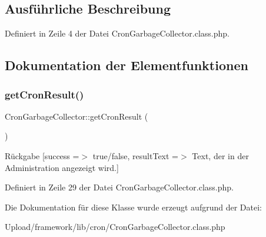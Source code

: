 \subsection{Ausführliche Beschreibung}


Definiert in Zeile 4 der Datei Cron\+Garbage\+Collector.\+class.\+php.



\subsection{Dokumentation der Elementfunktionen}
\mbox{\label{class_cron_garbage_collector_acb6c3939fc7ea4a2a464e5f274266824}} 
\subsubsection{\texorpdfstring{get\+Cron\+Result()}{getCronResult()}}
{\footnotesize\ttfamily Cron\+Garbage\+Collector\+::get\+Cron\+Result (\begin{DoxyParamCaption}{ }\end{DoxyParamCaption})}

\begin{DoxyReturn}{Rückgabe}
\mbox{[}\textquotesingle{}success\textquotesingle{} =$>$ \textquotesingle{}true/false\textquotesingle{}, \textquotesingle{}result\+Text\textquotesingle{} =$>$ \textquotesingle{}Text, der in der Administration angezeigt wird.\textquotesingle{}\mbox{]} 
\end{DoxyReturn}


Definiert in Zeile 29 der Datei Cron\+Garbage\+Collector.\+class.\+php.



Die Dokumentation für diese Klasse wurde erzeugt aufgrund der Datei\+:\begin{DoxyCompactItemize}
\item 
Upload/framework/lib/cron/Cron\+Garbage\+Collector.\+class.\+php\end{DoxyCompactItemize}
